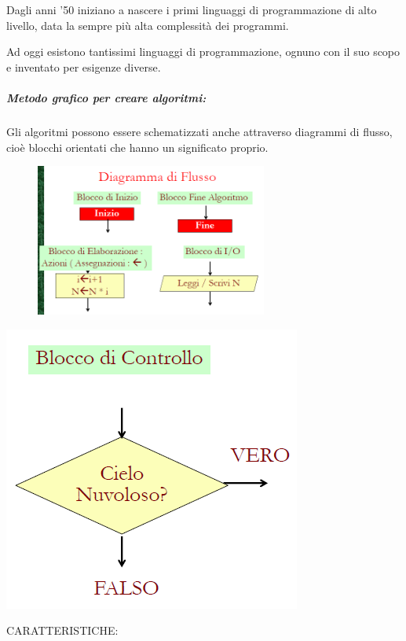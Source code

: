 \documentclass[
  paper=a4,
  oneside  ,captions=tableheading
]{scrbook}
\begin{document}
Dagli anni '50 iniziano a nascere i primi linguaggi di programmazione di
alto livello, data la sempre più alta complessità dei programmi.

Ad oggi esistono tantissimi linguaggi di programmazione, ognuno con il
suo scopo e inventato per esigenze diverse.

\hypertarget{metodo-grafico-per-creare-algoritmi}{%
\subparagraph{Metodo grafico per creare
algoritmi:}\label{metodo-grafico-per-creare-algoritmi}}

Gli algoritmi possono essere schematizzati anche attraverso diagrammi di
flusso, cioè blocchi orientati che hanno un significato proprio.
\begin{figure}
	\includegraphics[height=5cm]{./image/image-20201111002115408.png}
\end{figure}
\includegraphics{./image/image-20201111002130617.png}

CARATTERISTICHE:
\end{document}

